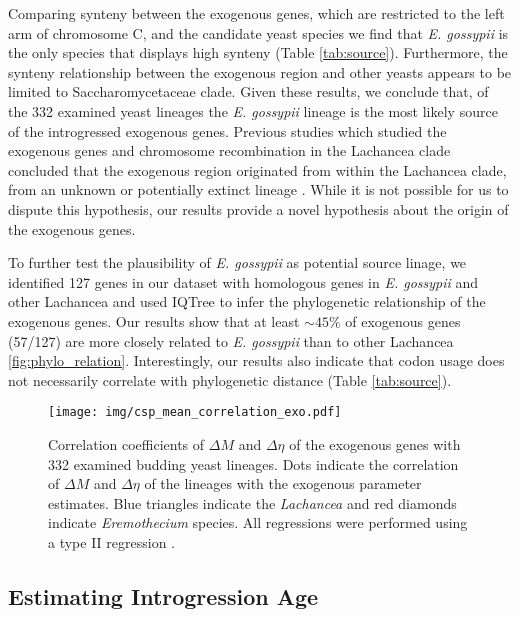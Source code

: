 \documentclass[doublespacing,linenumbers]{bmcart}
\newcommand{\gossypii}{\textit{E. gossypii}\xspace}
\newcommand{\DM}{\ensuremath{{\Delta M}}\xspace}
\newcommand{\DE}{\ensuremath{{\Delta \eta}}\xspace}
\begin{document}
Comparing synteny between the exogenous genes, which are restricted to the left arm of chromosome C, and the candidate yeast species we find that \gossypii is the only species that displays high synteny (Table \ref{tab:source}).
Furthermore, the synteny relationship between the exogenous region and other yeasts appears to be limited to Saccharomycetaceae clade.
Given these results, we conclude that, of the 332 examined yeast lineages the \gossypii lineage is the most likely source of the introgressed exogenous genes.
Previous studies which studied the exogenous genes and chromosome recombination in the Lachancea clade concluded that the exogenous region originated from within the Lachancea clade, from an unknown or potentially extinct lineage \citep{payen2009, friedrich2015, vakirlis2016}.
While it is not possible for us to dispute this hypothesis, our results provide a novel hypothesis about the origin of the exogenous genes.

To further test the plausibility of \gossypii as potential source linage, we identified 127 genes in our dataset \citep{shen2018} with homologous genes in \gossypii and other Lachancea and used IQTree \citep{nguyen2015} to infer the phylogenetic relationship of the exogenous genes. 
Our results show that at least $\sim 45 \%$ of exogenous genes (57/127) are more closely related to \gossypii than to other Lachancea \ref{fig:phylo_relation}.
Interestingly, our results also indicate that codon usage does not necessarily correlate with phylogenetic distance (Table \ref{tab:source}). 

\begin{figure}
     \centering
	\texttt{[image: img/csp\_mean\_correlation\_exo.pdf]}
	\caption{Correlation coefficients of \DM and \DE of the exogenous genes with 332 examined budding yeast lineages. 
	Dots indicate the correlation of \DM and \DE of the lineages with the exogenous parameter estimates.
	Blue triangles indicate the \textit{Lachancea} and red diamonds indicate \textit{Eremothecium} species.
	All regressions were performed using a type II regression \citep{SokalAndRohlf1981}.}
	\label{fig:csp_exo_comp}
\end{figure}


\subsection*{Estimating Introgression Age}
\end{document}
